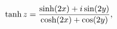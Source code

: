 \[\mathop{\tanh\/}\nolimits z=\frac{\mathop{\sinh\/}\nolimits\!\left(2x\right)+i%
\mathop{\sin\/}\nolimits\!\left(2y\right)}{\mathop{\cosh\/}\nolimits\!\left(2x%
\right)+\mathop{\cos\/}\nolimits\!\left(2y\right)},\]